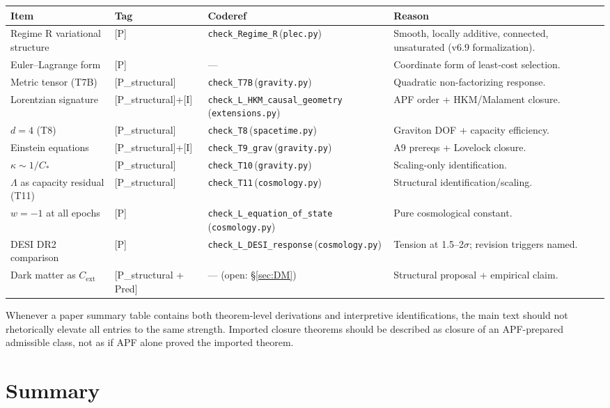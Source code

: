 \documentclass[11pt]{article}
\newcommand{\coderef}[2]{\texttt{#1}\,(\texttt{#2})}
\begin{document}
\begin{center}
\begin{tabular}{@{}llll@{}}
\toprule
Item & Tag & Coderef & Reason \\
\midrule
Regime R variational structure & [P] & \coderef{check\_Regime\_R}{plec.py} & Smooth, locally additive, connected, unsaturated (v6.9 formalization). \\
Euler--Lagrange form & [P] & --- & Coordinate form of least-cost selection. \\
Metric tensor (T7B) & [P\_structural] & \coderef{check\_T7B}{gravity.py} & Quadratic non-factorizing response. \\
Lorentzian signature & [P\_structural]+[I] & \coderef{check\_L\_HKM\_causal\_geometry}{extensions.py} & APF order + HKM/Malament closure. \\
$d = 4$ (T8) & [P\_structural] & \coderef{check\_T8}{spacetime.py} & Graviton DOF + capacity efficiency. \\
Einstein equations & [P\_structural]+[I] & \coderef{check\_T9\_grav}{gravity.py} & A9 prereqs + Lovelock closure. \\
$\kappa \sim 1/C_{\ast}$ & [P\_structural] & \coderef{check\_T10}{gravity.py} & Scaling-only identification. \\
$\Lambda$ as capacity residual (T11) & [P\_structural] & \coderef{check\_T11}{cosmology.py} & Structural identification/scaling. \\
$w = -1$ at all epochs & [P] & \coderef{check\_L\_equation\_of\_state}{cosmology.py} & Pure cosmological constant. \\
DESI DR2 comparison & [P] & \coderef{check\_L\_DESI\_response}{cosmology.py} & Tension at 1.5--2$\sigma$; revision triggers named. \\
Dark matter as $C_{\mathrm{ext}}$ & [P\_structural + Pred] & --- (open: \S\ref{sec:DM}) & Structural proposal + empirical claim. \\
\bottomrule
\end{tabular}
\end{center}

Whenever a paper summary table contains both theorem-level derivations and
interpretive identifications, the main text should not rhetorically elevate all
entries to the same strength. Imported closure theorems should be described as
closure of an APF-prepared admissible class, not as if APF alone proved the
imported theorem.

\section{Summary}\label{sec:summary}
\end{document}
